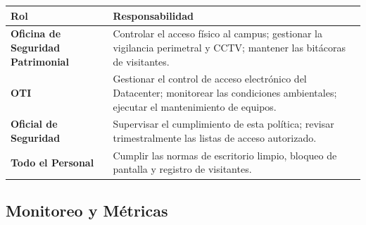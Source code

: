 \documentclass[10pt,letterpaper]{article}
\begin{document}
{\setlength{\RaggedRightRightskip}{0pt plus 5em}\small\sloppy \begin{longtable}[]{@{}
  >{\hspace{0pt}\RaggedRight\arraybackslash}p{}
  >{\hspace{0pt}\RaggedRight\arraybackslash}p{}@{}}
\toprule\noalign{}
\begin{minipage}[b]{\linewidth}\raggedright
Rol
\end{minipage} & \begin{minipage}[b]{\linewidth}\raggedright
Responsabilidad
\end{minipage} \\
\midrule\noalign{}
\endhead
\bottomrule\noalign{}
\endlastfoot
\textbf{Oficina de Seguridad Patrimonial} & Controlar el acceso físico
al campus; gestionar la vigilancia perimetral y CCTV; mantener las
bitácoras de visitantes. \\
\textbf{OTI} & Gestionar el control de acceso electrónico del
Datacenter; monitorear las condiciones ambientales; ejecutar el
mantenimiento de equipos. \\
\textbf{Oficial de Seguridad} & Supervisar el cumplimiento de esta
política; revisar trimestralmente las listas de acceso autorizado. \\
\textbf{Todo el Personal} & Cumplir las normas de escritorio limpio,
bloqueo de pantalla y registro de visitantes. \\
\end{longtable}\normalsize}

\subsection{Monitoreo y Métricas}\label{monitoreo-y-muxe9tricas}
\end{document}
